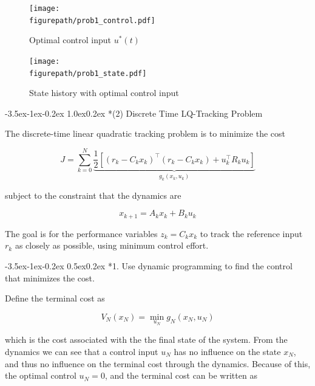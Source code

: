 \documentclass[11pt,letterpaper,onecolumn,notitlepage]{article}
\makeatletter
\newcommand{\figurepath}{../fig/hw2}
\renewcommand\section{\@startsection{section}{1}{\z@}%
{-3.5ex\@plus-1ex\@minus-0.2ex}%
{1.0ex\@plus0.2ex}%
{\fontsize{12pt}{12pt}\selectfont\bfseries\sffamily}}
\renewcommand\subsection{\@startsection{subsection}{1}{\z@}%
{-3.5ex\@plus-1ex\@minus-0.2ex}%
{0.5ex\@plus0.2ex}%
{\fontsize{10pt}{10pt}\selectfont\bfseries\sffamily}}
\makeatother
\begin{document}
  \begin{figure}[H]
    \centering
    \begin{minipage}{.48\textwidth}
      \centering
      \texttt{[image: \\figurepath/prob1\_control.pdf]}
      \caption{Optimal control input $u^{*}(t)$\label{fig:part1_control}}
    \end{minipage}
    \hfill
    \begin{minipage}{.48\textwidth}
      \centering
      \texttt{[image: \\figurepath/prob1\_state.pdf]}
      \caption{State history with optimal control input\label{fig:part1_state}}
    \end{minipage}
  \end{figure}

  \clearpage
  \section*{(2) Discrete Time LQ-Tracking Problem}

  The discrete-time linear quadratic tracking problem is to minimize the cost

  \begin{equation*}
    J=\sum_{k=0}^{N}\underbrace{\frac{1}{2}\left[(r_{k}-C_{k}x_{k})^{\top}(r_{k}-C_{k}x_{k})+u_{k}^{\top}R_{k}u_{k}\right]}_{g_{k}(x_{k},u_{k})}
  \end{equation*}

  subject to the constraint that the dynamics are

  \begin{equation*}
    x_{k+1}=A_{k}x_{k}+B_{k}u_{k}
  \end{equation*}

  The goal is for the performance variables $z_{k}=C_{k}x_{k}$ to track the reference input $r_{k}$ as closely as possible, using minimum control effort.

  \subsection*{1. Use dynamic programming to find the control that minimizes the cost.}

  Define the terminal cost as

  \begin{equation*}
    V_{N}(x_{N})=\min_{u_{N}}g_{N}(x_{N},u_{N})
  \end{equation*}

  which is the cost associated with the the final state of the system.
  From the dynamics we can see that a control input $u_{N}$ has no influence on the state $x_{N}$, and thus no influence on the terminal cost through the dynamics.
  Because of this, the optimal control $u_{N}=0$, and the terminal cost can be written as
\end{document}
